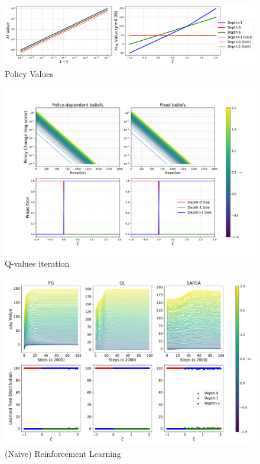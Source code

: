\begin{figure}
    \centering
    \includegraphics[width=1\textwidth]{images/images_part1/policy_values_comparison.pdf}
    \caption{Policy Values}\label{fig:policy-values}
\end{figure}


\begin{figure}
    \centering
    \includegraphics[width=1\textwidth]{images/images_part1/qiteration.pdf}
    \caption{Q-values iteration}\label{fig:qiteration}
\end{figure}

\begin{figure}
    \centering
    \includegraphics[width=1\textwidth]{images/images_part1/quick_plot_combined.pdf}
    \caption{(Naive) Reinforcement Learning}\label{fig:rl}
\end{figure}